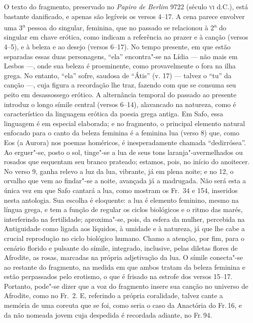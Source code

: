 {\small O texto do fragmento, preservado no \textit{Papiro de Berlim} 9722 (século \textsc{vi}
d.C.), está bastante danificado, e apenas são legíveis os versos 4--17.
A cena parece envolver uma 3\textsuperscript{a} pessoa do
singular, feminina, que no passado se relacionou à 2\textsuperscript{a} do
singular em chave erótica, como indicam a referência ao prazer e à canção		
(versos 4--5), e à beleza e ao desejo (versos 6--17). No tempo presente, 
em que estão separadas essas duas personagens, ``ela” encontra"-se na Lídia --- não
mais em Lesbos ---, onde sua beleza é proeminente, como provavelmente o fora na
ilha grega. No entanto, ``ela” sofre, saudosa de ``Átis” (v.
17) --- talvez o ``tu” da canção ---, cuja figura a recordação lhe traz, fazendo
com que se consuma seu peito em desassossego erótico. A alternância temporal do
passado ao presente introduz o longo símile central (versos 6--14), alavancado
na natureza, como é característico da linguagem erótica da poesia grega antiga.
Em Safo, essa linguagem é em especial elaborada; e no fragmento, o principal
elemento natural enfocado para o canto da beleza feminina é a feminina lua
(verso 8) que, como Eos (a Aurora) nos poemas homéricos, é inesperadamente
chamada ``dedirrósea”. Ao erguer"-se, posto o sol, tinge"-se a lua
de seus tons laranja"-avermelhados ou rosados que esquentam seu branco prateado;
estamos, pois, no início do anoitecer. No verso 9, ganha relevo a luz da lua,
vibrante, já em plena noite; e no 12, o orvalho que vem ao findar"-se a noite,
avançada já a madrugada. Não será esta a única vez em que Safo cantará a lua,
como mostram os Fr.~34 e 154, inseridos nesta antologia. Sua escolha é
eloquente: a lua é elemento feminino, mesmo na língua grega, e tem a função de
regular os ciclos biológicos e o ritmo das marés, interferindo na fertilidade;
aproxima"-se, pois, da esfera da mulher, percebida na Antiguidade como ligada
aos líquidos, à umidade e à natureza, já que lhe cabe a crucial
reprodução no ciclo biológico humano. Chamo a atenção, por fim, para o cenário
florido e pulsante do símile, integrado, inclusive, pelas diletas flores de
Afrodite, as rosas, marcadas na própria adjetivação da lua. O símile conecta"-se
ao restante do fragmento, na medida em que ambos tratam da beleza feminina e
estão perpassados pelo erotismo, o que é frisado na estrofe dos versos 15--17.
Portanto, pode"-se dizer que a voz do fragmento insere sua canção no universo de
Afrodite, como no Fr.~2.
E, referindo a própria coralidade, talvez cante a memória de uma coreuta que se foi, como seria o caso da Anactória do Fr.\,16, e da não nomeada jovem cuja despedida é recordada adiante, no Fr.\,94.}

